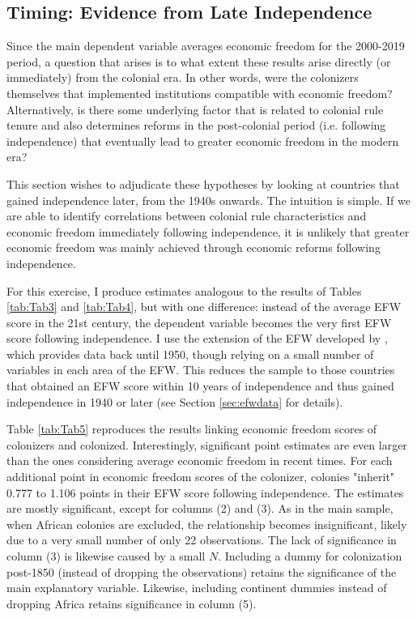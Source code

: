 \documentclass[a4paper,12pt]{article}
\begin{document}
\subsection{Timing: Evidence from Late Independence}\label{sec:late}

Since the main dependent variable averages economic freedom for the 2000-2019 period, a question that arises is to what extent these results arise directly (or immediately) from the colonial era. In other words, were the colonizers themselves that implemented institutions compatible with economic freedom? Alternatively, is there some underlying factor that is related to colonial rule tenure and also determines reforms in the post-colonial period (i.e. following independence) that eventually lead to greater economic freedom in the modern era? 

This section wishes to adjudicate these hypotheses by looking at countries that gained independence later, from the 1940s onwards. The intuition is simple. If we are able to identify correlations between colonial rule characteristics and economic freedom immediately following independence, it is unlikely that greater economic freedom was mainly achieved through economic reforms following independence. 

For this exercise, I produce estimates analogous to the results of Tables \ref{tab:Tab3} and \ref{tab:Tab4}, but with one difference: instead of the average EFW score in the 21st century, the dependent variable becomes the very first EFW score following independence. I use the extension of the EFW developed by \cite{murphy2018extending}, which provides data back until 1950, though relying on a small number of variables in each area of the EFW. This reduces the sample to those countries that obtained an EFW score within 10 years of independence and thus gained independence in 1940 or later (see Section \ref{sec:efwdata} for details). 

Table \ref{tab:Tab5} reproduces the results linking economic freedom scores of colonizers and colonized. Interestingly, significant point estimates are even larger than the ones considering average economic freedom in recent times. For each additional point in economic freedom scores of the colonizer, colonies "inherit" 0.777 to 1.106 points in their EFW score following independence. The estimates are mostly significant, except for columns (2) and (3). As in the main sample, when African colonies are excluded, the relationship becomes insignificant, likely due to a very small number of only 22 observations. The lack of significance in column (3) is likewise caused by a small $N$. Including a dummy for colonization post-1850 (instead of dropping the observations) retains the significance of the main explanatory variable. Likewise, including continent dummies instead of dropping Africa retains significance in column (5).
\end{document}
